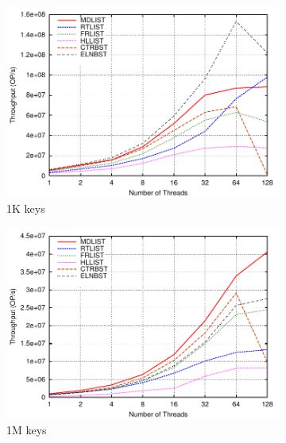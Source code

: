 \documentclass[10pt,conference,compsocconf]{IEEEtran}
\begin{document}
\begin{figure}[t]
    \begin{subfigure}{0.32\textwidth}
        \centering
        \includegraphics[width=1\columnwidth]{./data/amd9ins1Kkey}
        \caption{1K keys}
        \label{fig:1k9ins}
    \end{subfigure}
    \hfill
    \begin{subfigure}{0.32\textwidth}
        \centering
        \includegraphics[width=1\columnwidth]{./data/amd9ins1Mkey}
        \caption{1M keys}
        \label{fig:1m9ins}
    \end{subfigure}
    \hfill
    \begin{subfigure}{0.32\textwidth}
        \centering

\end{subfigure}
\end{figure}
\end{document}
